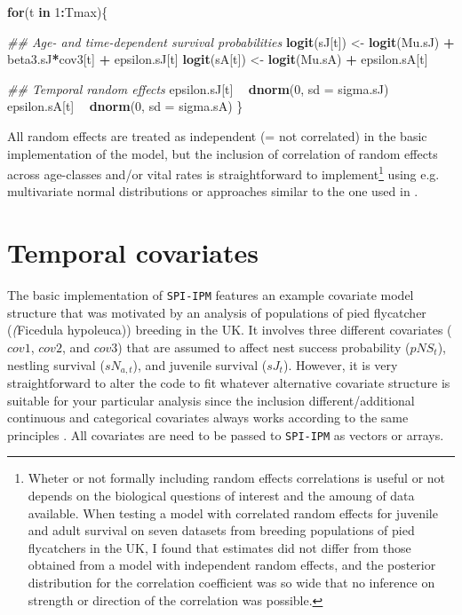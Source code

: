 \documentclass[
]{book}
\newenvironment{Shaded}{\begin{snugshade}}{\end{snugshade}}
\newcommand{\CommentTok}[1]{\textcolor[rgb]{0.56,0.35,0.01}{\textit{#1}}}
\newcommand{\ControlFlowTok}[1]{\textcolor[rgb]{0.13,0.29,0.53}{\textbf{#1}}}
\newcommand{\DataTypeTok}[1]{\textcolor[rgb]{0.13,0.29,0.53}{#1}}
\newcommand{\DecValTok}[1]{\textcolor[rgb]{0.00,0.00,0.81}{#1}}
\newcommand{\KeywordTok}[1]{\textcolor[rgb]{0.13,0.29,0.53}{\textbf{#1}}}
\newcommand{\NormalTok}[1]{#1}
\newcommand{\OperatorTok}[1]{\textcolor[rgb]{0.81,0.36,0.00}{\textbf{#1}}}
\newcommand{\StringTok}[1]{\textcolor[rgb]{0.31,0.60,0.02}{#1}}
\begin{document}
\begin{Shaded}
\begin{Highlighting}[]
\ControlFlowTok{for}\NormalTok{(t }\ControlFlowTok{in} \DecValTok{1}\OperatorTok{:}\NormalTok{Tmax)\{}
    
  \CommentTok{## Age- and time-dependent survival probabilities}
  \KeywordTok{logit}\NormalTok{(sJ[t]) <-}\StringTok{ }\KeywordTok{logit}\NormalTok{(Mu.sJ) }\OperatorTok{+}\StringTok{ }\NormalTok{beta3.sJ}\OperatorTok{*}\NormalTok{cov3[t] }\OperatorTok{+}\StringTok{ }\NormalTok{epsilon.sJ[t]}
  \KeywordTok{logit}\NormalTok{(sA[t]) <-}\StringTok{ }\KeywordTok{logit}\NormalTok{(Mu.sA) }\OperatorTok{+}\StringTok{ }\NormalTok{epsilon.sA[t]}

  \CommentTok{## Temporal random effects}
\NormalTok{    epsilon.sJ[t] }\OperatorTok{~}\StringTok{ }\KeywordTok{dnorm}\NormalTok{(}\DecValTok{0}\NormalTok{, }\DataTypeTok{sd =}\NormalTok{ sigma.sJ)}
\NormalTok{    epsilon.sA[t] }\OperatorTok{~}\StringTok{ }\KeywordTok{dnorm}\NormalTok{(}\DecValTok{0}\NormalTok{, }\DataTypeTok{sd =}\NormalTok{ sigma.sA)}
\NormalTok{\}}
\end{Highlighting}
\end{Shaded}

All random effects are treated as independent (= not correlated) in the basic
implementation of the model, but the inclusion of correlation of random effects
across age-classes and/or vital rates is straightforward to implement\footnote{Wheter or
  not formally including random effects correlations is useful or not depends on
  the biological questions of interest and the amoung of data available. When
  testing a model with correlated random effects for juvenile and adult survival
  on seven datasets from breeding populations of pied flycatchers in the UK, I
  found that estimates did not differ from those obtained from a model with
  independent random effects, and the posterior distribution for the correlation
  coefficient was so wide that no inference on strength or direction of the
  correlation was possible.} using e.g.
multivariate normal distributions or approaches similar to the one used in
\citet{nater2020}.

\hypertarget{temporal-covariates}{%
\section{Temporal covariates}\label{temporal-covariates}}

The basic implementation of \texttt{SPI-IPM} features an example covariate model
structure that was motivated by an analysis of populations of pied flycatcher
(\textit(Ficedula hypoleuca)) breeding in the UK. It involves three different
covariates (\(cov1\), \(cov2\), and \(cov3\)) that are assumed to affect nest success
probability (\(pNS_{t}\)), nestling survival (\(sN_{a,t}\)), and juvenile survival
(\(sJ_t\)). However, it is very straightforward to alter the code to fit whatever
alternative covariate structure is suitable for your particular analysis since
the inclusion different/additional continuous and categorical covariates always
works according to the same principles \citep[see also][]{kery2011}. All covariates are
need to be passed to \texttt{SPI-IPM} as vectors or arrays.
\end{document}
